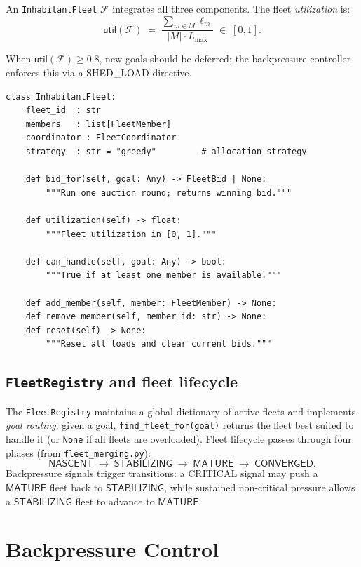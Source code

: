 \documentclass[11pt]{article}
\providecommand{\Fleet}{\mathcal{F}}               %
\providecommand{\Members}{M}                        %
\providecommand{\load}{\ell}                       %
\providecommand{\util}{\mathsf{util}}              %
\providecommand{\maxload}{L_{\max}}                %
\providecommand{\FleetPY}{\texttt{InhabitantFleet}}
\providecommand{\RegPY}{\texttt{FleetRegistry}}
\providecommand{\Nascent}{\mathsf{NASCENT}}
\providecommand{\Stabilizing}{\ensuremath{\mathsf{STABILIZING}}}
\providecommand{\Mature}{\ensuremath{\mathsf{MATURE}}}
\providecommand{\Converged}{\mathsf{CONVERGED}}
\begin{document}
An \FleetPY{} $\Fleet$ integrates all three components.  The fleet
\emph{utilization} is:
\[
  \util(\Fleet)
  \;=\;
  \frac{\displaystyle\sum_{m \in \Members} \load_m}{|\Members| \cdot \maxload}
  \;\in\; [0, 1].
\]

When $\util(\Fleet) \geq 0.8$, new goals should be deferred; the backpressure
controller enforces this via a SHED\_LOAD directive.

\begin{lstlisting}[style=jugeo-python, caption={\FleetPY{} core interface.}]
class InhabitantFleet:
    fleet_id  : str
    members   : list[FleetMember]
    coordinator : FleetCoordinator
    strategy  : str = "greedy"         # allocation strategy

    def bid_for(self, goal: Any) -> FleetBid | None:
        """Run one auction round; returns winning bid."""

    def utilization(self) -> float:
        """Fleet utilization in [0, 1]."""

    def can_handle(self, goal: Any) -> bool:
        """True if at least one member is available."""

    def add_member(self, member: FleetMember) -> None:
    def remove_member(self, member_id: str) -> None:
    def reset(self) -> None:
        """Reset all loads and clear current bids."""
\end{lstlisting}

\subsection{\RegPY{} and fleet lifecycle}

The \RegPY{} maintains a global dictionary of active fleets and
implements \emph{goal routing}: given a goal, \texttt{find\_fleet\_for(goal)}
returns the fleet best suited to handle it (or \texttt{None} if all fleets are
overloaded).  Fleet lifecycle passes through four phases (from
\texttt{fleet\_merging.py}):
\[
  \Nascent \;\longrightarrow\; \Stabilizing
            \;\longrightarrow\; \Mature
            \;\longrightarrow\; \Converged.
\]
Backpressure signals trigger transitions: a CRITICAL signal may push a
\Mature{} fleet back to \Stabilizing{}, while sustained non-critical pressure
allows a \Stabilizing{} fleet to advance to \Mature{}.

\section{Backpressure Control}\label{sec:backpressure}
\end{document}
